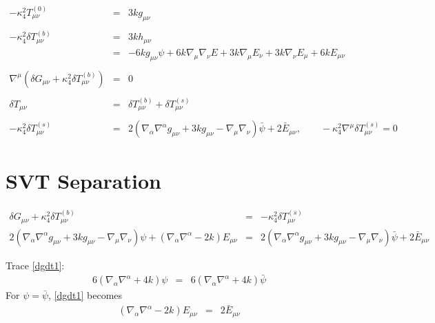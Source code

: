 \documentclass[10pt,letterpaper]{article}
\numberwithin{equation}{section}
\begin{document}
\begin{eqnarray}
-\kappa^2_4 T^{(0)}_{\mu\nu} &=& 3k g_{\mu\nu}
\nonumber\\ \nonumber\\
-\kappa^2_4 \delta T^{(b)}_{\mu\nu} &=& 3k h_{\mu\nu}
\nonumber\\ 
&=& -6kg_{\mu\nu}\psi +6k\nabla_\mu\nabla_\nu E + 3k\nabla_\mu E_\nu + 3k\nabla_\nu E_\mu + 6kE_{\mu\nu}
\nonumber\\ \nonumber\\
\nabla^\mu ( \delta G_{\mu\nu} + \kappa^2_4 \delta T_{\mu\nu}^{(b)}) &=& 0
\nonumber\\ \nonumber\\
\delta T_{\mu\nu} &=& \delta T_{\mu\nu}^{(b)}+\delta T_{\mu\nu}^{(s)}
\nonumber\\ \nonumber\\
-\kappa^2_4 \delta T_{\mu\nu}^{(s)} &=& 2\left( \nabla_\alpha\nabla^\alpha g_{\mu\nu} +3k g_{\mu\nu} - \nabla_\mu\nabla_\nu\right)\bar\psi + 2\bar E_{\mu\nu},\qquad -\kappa^2_4\nabla^\mu \delta T_{\mu\nu}^{(s)}=0
\end{eqnarray}

\section{SVT Separation}
\begin{eqnarray}
\delta G_{\mu\nu}+\kappa^2_4 \delta T_{\mu\nu}^{(b)}  &=& -\kappa^2_4 \delta T_{\mu\nu}^{(s)}
\nonumber\\
2\left( \nabla_\alpha\nabla^\alpha g_{\mu\nu} +3k g_{\mu\nu} - \nabla_\mu\nabla_\nu\right)\psi + (\nabla_\alpha\nabla^\alpha -2k) E_{\mu\nu}&=& 
2\left( \nabla_\alpha\nabla^\alpha g_{\mu\nu} +3k g_{\mu\nu} - \nabla_\mu\nabla_\nu\right)\bar\psi + 2\bar E_{\mu\nu}
\label{dgdt1}
\end{eqnarray}

Trace \eqref{dgdt1}:
\begin{eqnarray}
6(\nabla_\alpha\nabla^\alpha+4k)\psi &=& 6(\nabla_\alpha\nabla^\alpha+4k)\bar\psi
\end{eqnarray}
For $\psi=\bar\psi$, \eqref{dgdt1} becomes
\begin{eqnarray}
(\nabla_\alpha\nabla^\alpha -2k)E_{\mu\nu} &=& 2\bar E_{\mu\nu} 
\end{eqnarray}

\end{document}
